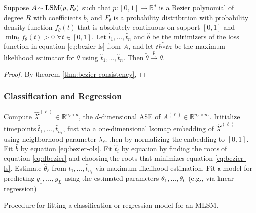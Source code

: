 \documentclass[12pt]{article}
\begin{document}
\begin{theorem}
Suppose $A \sim \mathrm{LSM}(p, F_\theta)$ such that $p : [0, 1] \to \mathbb{R}^d$ is a Bezier polynomial of degree $R$ with coefficients $b$, and $F_\theta$ is a probability distribution with probability density function $f_\theta(t)$ that is absolutely continuous on support $[0, 1]$ and $\min_t f_\theta(t) > 0$ $\forall t \in [0, 1]$. 
Let $\hat{t}_1, ..., \hat{t}_n$ and $\hat{b}$ be the minimizers of the loss function in equation \ref{eq:bezier-ls} from $A$, and let $\tilde{theta}$ be the maximum likelihood estimator for $\theta$ using $\hat{t}_1, ..., \hat{t}_n$. 
Then $\tilde{\theta} \stackrel{p}{\to} \theta$. 
\end{theorem}

\begin{proof}
By theorem \ref{thm:bezier-consistency}, 
\end{proof}

\hypertarget{classification-and-regression}{%
\subsubsection{Classification and
Regression}\label{classification-and-regression}}

\begin{algorithm}[H]
\label{alg:mlsm-fit}
\DontPrintSemicolon
\SetAlgoLined
{}
 {
  Compute $\hat{X}^{(\ell)} \in \mathbb{R}^{n_\ell \times d}$, the $d$-dimensional ASE of $A^{(\ell)} \in \mathbb{R}^{n_\ell \times n_\ell}$.\;
  Initialize timepoints $\hat{t}_1, ..., \hat{t}_{n_\ell}$, first via a one-dimensional Isomap embedding of $\hat{X}^{(\ell)}$ using neighborhood parameter $\lambda_\ell$, then by normalizing the embedding to $[0, 1]$.\;
   {
    Fit $\hat{b}$ by equation \ref{eq:bezier-ols}.\;
     {
      Fit $\hat{t}_i$ by equation by finding the roots of equation \ref{eq:dbezier} and choosing the roots that minimizes equation \ref{eq:bezier-ls}.\;
    }
  }
  Estimate $\hat{\theta}_\ell$ from $\hat{t}_1, ..., \hat{t}_{n_\ell}$ via maximum likelihood estimation.\;
}
Fit a model for predicting $y_1, ..., y_L$ using the estimated parameters $\theta_1, ..., \theta_L$ (e.g., via linear regression).\;
\caption{Procedure for fitting a classification or regression model for an MLSM.}
\end{algorithm}
\end{document}
